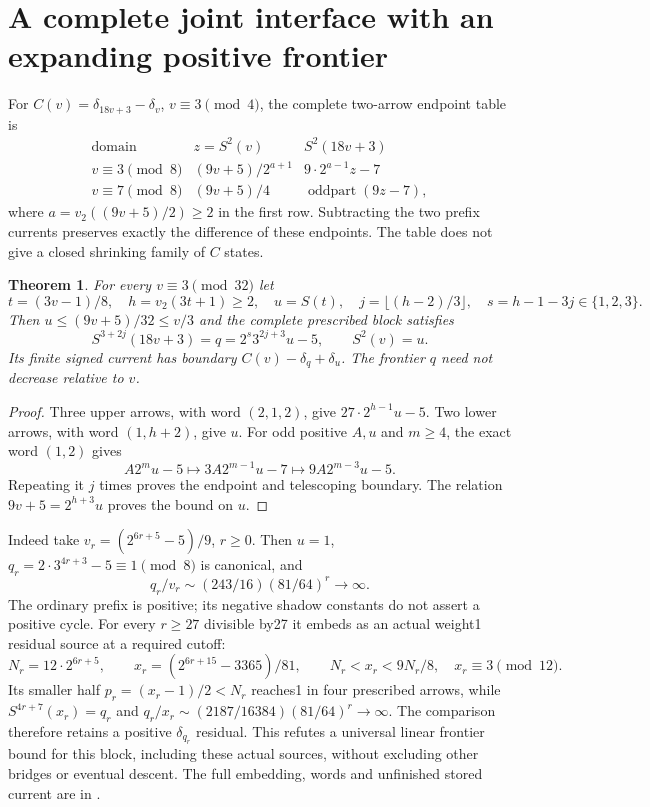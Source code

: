 \documentclass[11pt]{article}
\newtheorem{theorem}{Theorem}
\begin{document}
\section{A complete joint interface with an expanding positive frontier}
For $C(v)=\delta_{18v+3}-\delta_v$, $v\equiv3\pmod4$, the complete
two-arrow endpoint table is
\[
\begin{array}{c|c|c}
\text{domain}&z=S^2(v)&S^2(18v+3)\\\hline
v\equiv3\pmod8&(9v+5)/2^{a+1}&9\cdot2^{a-1}z-7\\
v\equiv7\pmod8&(9v+5)/4&\operatorname{oddpart}(9z-7),
\end{array}
\]
where $a=v_2((9v+5)/2)\ge2$ in the first row. Subtracting the two prefix
currents preserves exactly the difference of these endpoints. The table
does not give a closed shrinking family of $C$ states.

\begin{theorem}\label{thm:jointfrontier}
For every $v\equiv3\pmod{32}$ let
\[
 t=(3v-1)/8,\quad h=v_2(3t+1)\ge2,\quad u=S(t),\quad
 j=\lfloor(h-2)/3\rfloor,\quad s=h-1-3j\in\{1,2,3\}.
\]
Then $u\le(9v+5)/32\le v/3$ and the complete prescribed block satisfies
\[
 S^{3+2j}(18v+3)=q=2^s3^{2j+3}u-5,\qquad S^2(v)=u.
\]
Its finite signed current has boundary $C(v)-\delta_q+\delta_u$.
The frontier $q$ need not decrease relative to $v$.
\end{theorem}
\begin{proof}
Three upper arrows, with word $(2,1,2)$, give $27\cdot2^{h-1}u-5$.
Two lower arrows, with word $(1,h+2)$, give $u$.
For odd positive $A,u$ and $m\ge4$, the exact word $(1,2)$ gives
\[
 A2^mu-5\longmapsto3A2^{m-1}u-7\longmapsto9A2^{m-3}u-5.
\]
Repeating it $j$ times proves the endpoint and telescoping boundary.
The relation $9v+5=2^{h+3}u$ proves the bound on $u$.
\end{proof}

Indeed take $v_r=(2^{6r+5}-5)/9$, $r\ge0$. Then $u=1$,
$q_r=2\cdot3^{4r+3}-5\equiv1\pmod8$ is canonical, and
\[
 q_r/v_r\sim(243/16)(81/64)^r\longrightarrow\infty.
\]
The ordinary prefix is positive; its negative shadow constants do not
assert a positive cycle. For every $r\ge27$ divisible by27 it embeds
as an actual weight1 residual source at a required cutoff:
\[
 N_r=12\cdot2^{6r+5},\qquad x_r=(2^{6r+15}-3365)/81,\qquad
 N_r<x_r<9N_r/8,\quad x_r\equiv3\pmod{12}.
\]
Its smaller half $p_r=(x_r-1)/2<N_r$ reaches1 in four prescribed arrows,
while $S^{4r+7}(x_r)=q_r$ and
$q_r/x_r\sim(2187/16384)(81/64)^r\to\infty$.
The comparison therefore retains a positive $\delta_{q_r}$ residual.
This refutes a universal linear frontier bound for this block, including
these actual sources, without excluding other bridges or eventual descent.
The full embedding, words and unfinished stored current are in
.
\end{document}
